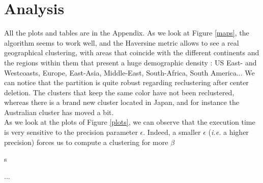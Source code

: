 \documentclass[a4paper,10pt]{article}
\begin{document}
\section{Analysis}
All the plots and tables are in the Appendix. As we look at Figure \ref{maps}, the algorithm seems to work well, and the Haversine metric allows to see a real geographical clustering, with areas that coincide with the different continents and the regions within them that present a huge demographic density : US East- and Westcoasts, Europe, East-Asia, Middle-East, South-Africa, South America... We can notice that the partition is quite robust regarding reclustering after center deletion. The clusters that keep the same color have not been reclustered, whereas there is a brand new cluster located in Japan, and for instance the Australian cluster has moved a bit.\\
As we look at the plots of Figure \ref{plots}, we can observe that the execution time is very sensitive to the precision parameter $\epsilon$. Indeed, a smaller $\epsilon$ (\textit{i.e.} a higher precision) forces us to compute a clustering for more $\beta$\begin{tiny}s\end{tiny}...
\end{document}
